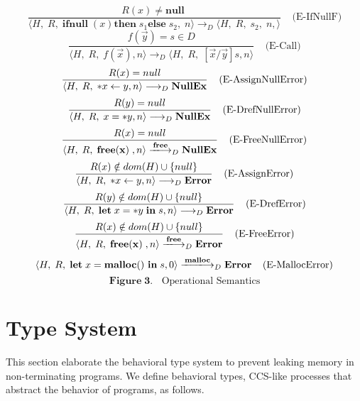 \documentclass[english]{jssst_ppl} %
\newcommand\LET{\mathbf{let}\;}
\newcommand\FREE{\mathbf{free(x)}\;}
\newcommand\IN{\mathbf{in}\;}
\newcommand\Rtab{\; \; \; \;}
\newcommand\NULL{\mathbf{null}\;}
\newcommand\IFNULL{\mathbf{ifnull}\;}
\newcommand\THEN{\mathbf{then}\;}
\newcommand\ELSE{\mathbf{else}\;}
\newcommand\Lfc{\left\{}
\newcommand\Rfc{\right\}}
\newcommand\Lb{\left[}
\newcommand\Rb{\right]}
\newcommand\coma{,\;}
\newcommand\Malloc{\mathbf{malloc}}
\newcommand\Free{\mathbf{free}}
\newcommand\Cirx{(x)}
\begin{document}
$$
    \frac{R(x) \neq \NULL}
           {\langle H \coma R \coma \IFNULL\Cirx \THEN  s_{1} \ELSE  s_{2} \coma  n \rangle
           \longrightarrow_{D}
           \langle H\coma R\coma s_{2} \coma  n, \rangle}
    \Rtab \mbox{(E-IfNullF)}
$$
$$
     \frac{f(\vec{y}) = s \in D}
            { \langle H\coma R\coma  f(\vec{x}) , n \rangle
               \longrightarrow_{D}
               \langle H\coma R\coma  \Lb \vec{x}/\vec{y} \Rb s , n \rangle}
      \Rtab \mbox{(E-Call)}
$$
$$
      \frac{R(x) = null}
            {\langle H\coma R\coma  *x \leftarrow y , n \rangle
              \longrightarrow_{D}
             \bf NullEx }
      \Rtab \mbox{(E-AssignNullError)}
$$
$$
      \frac{R(y) = null}
             {\langle H\coma R\coma  x = *y, n \rangle
               \longrightarrow_{D}
              \bf NullEx }
             \Rtab \mbox{(E-DrefNullError)}
$$
$$
     \frac{R(x) =  null }
           {\langle H\coma R\coma  \FREE , n \rangle
             \xlongrightarrow{\Free}_{D} \bf NullEx  }
      \Rtab \mbox{(E-FreeNullError)}
$$
$$
     \frac{R(x) \notin dom(H) \cup \Lfc null \Rfc}
           {\langle H\coma R\coma   *x \leftarrow y,  n \rangle
             \longrightarrow_{D}
           \bf  Error }
    \Rtab \mbox{(E-AssignError)}
$$
$$
      \frac{R(y) \notin dom(H) \cup \Lfc null \Rfc}
           {\langle H\coma R\coma  \LET x  = *y \; \IN s, n \rangle
              \longrightarrow_{D}
                \bf  Error }
      \Rtab \mbox{(E-DrefError)}
$$
%
$$
      \frac{R(x) \notin dom(H) \cup \Lfc null \Rfc}
            {\langle H\coma R\coma  \FREE , n \rangle
              \xlongrightarrow{\Free}_{D}
              \bf Error }
     \Rtab \mbox{(E-FreeError)}
$$
$$
      \langle H\coma R\coma \LET x = \Malloc() \ \IN s ,  0  \rangle
      \xlongrightarrow{\Malloc}_{D}
      \mathbf{Error}
      \Rtab \mbox{(E-MallocError)}
$$
$$
     \mathbf{Figure \; 3.} \;\;  \mbox{ Operational Semantics}
$$
%

\section{Type System}
This section elaborate the behavioral type system to prevent leaking memory in non-terminating programs. We define behavioral types, CCS-like processes that abstract the behavior of programs, as follows.
\end{document}

